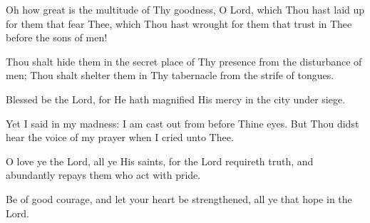 Oh how great is the multitude of Thy goodness, O Lord, which Thou hast laid up for them that fear Thee, which Thou hast wrought for them that trust in Thee before the sons of men!

Thou shalt hide them in the secret place of Thy presence from the disturbance of men; Thou shalt shelter them in Thy tabernacle from the strife of tongues.

Blessed be the Lord, for He hath magnified His mercy in the city under siege.

Yet I said in my madness: I am cast out from before Thine eyes. But Thou didst hear the voice of my prayer when I cried unto Thee.

O love ye the Lord, all ye His saints, for the Lord requireth truth, and abundantly repays them who act with pride.

Be of good courage, and let your heart be strengthened, all ye that hope in the Lord.
